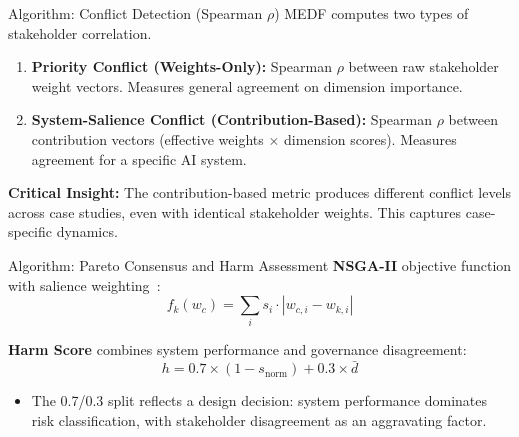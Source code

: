 \begin{frame}{Algorithm: Conflict Detection (Spearman $\rho$)}
    MEDF computes two types of stakeholder correlation.

    \vspace{6pt}
    \begin{enumerate}
        \item \textbf{Priority Conflict (Weights-Only):} Spearman $\rho$ between raw stakeholder weight vectors. Measures general agreement on dimension importance.
        \item \textbf{System-Salience Conflict (Contribution-Based):} Spearman $\rho$ between contribution vectors (effective weights $\times$ dimension scores). Measures agreement for a specific AI system.
    \end{enumerate}

    \vspace{6pt}
    \textbf{Critical Insight:} The contribution-based metric produces different conflict levels across case studies, even with identical stakeholder weights. This captures case-specific dynamics.
\end{frame}

\begin{frame}{Algorithm: Pareto Consensus and Harm Assessment}
    \textbf{NSGA-II} objective function with salience weighting~\cite{deb2002nsga}:
    \[
        f_k(w_c) = \sum_i s_i \cdot |w_{c,i} - w_{k,i}|
    \]

    \textbf{Harm Score} combines system performance and governance disagreement:
    \[
        h = 0.7 \times (1 - s_{\text{norm}}) + 0.3 \times \bar{d}
    \]

    \vspace{4pt}
    \begin{itemize}
        \item The 0.7/0.3 split reflects a design decision: system performance dominates risk classification, with stakeholder disagreement as an aggravating factor.
    \end{itemize}
\end{frame}
